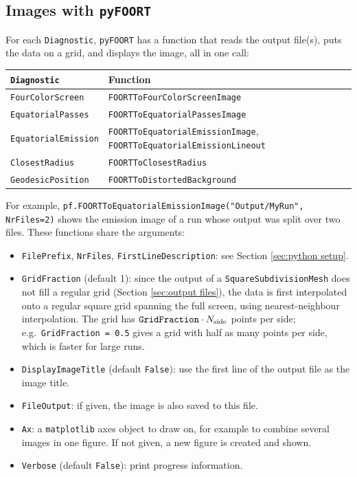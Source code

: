 \documentclass[11pt,a4paper]{article}
\newcommand{\code}[1]{{\tt #1}}
\begin{document}
\subsection{Images with \code{pyFOORT}}\label{sec:pyFOORT}
 
For each \code{Diagnostic}, \code{pyFOORT} has a function that reads the output file(s), puts the data on a grid, and displays the image, all in one call:
\begin{center}
\begin{tabular}{ll}
\code{Diagnostic} & Function \\ \hline
\code{FourColorScreen} & \code{FOORTToFourColorScreenImage} \\
\code{EquatorialPasses} & \code{FOORTToEquatorialPassesImage} \\
\code{EquatorialEmission} & \code{FOORTToEquatorialEmissionImage}, \code{FOORTToEquatorialEmissionLineout} \\
\code{ClosestRadius} & \code{FOORTToClosestRadius} \\
\code{GeodesicPosition} & \code{FOORTToDistortedBackground}
\end{tabular}
\end{center}
For example, \code{pf.FOORTToEquatorialEmissionImage("Output/MyRun", NrFiles=2)} shows the emission image of a run whose output was split over two files. These functions share the arguments:
\begin{itemize}
 \item \code{FilePrefix}, \code{NrFiles}, \code{FirstLineDescription}: see Section \ref{sec:python setup}.
 \item \code{GridFraction} (default 1): since the output of a \code{SquareSubdivisionMesh} does not fill a regular grid (Section \ref{sec:output files}), the data is first interpolated onto a regular square grid spanning the full screen, using nearest-neighbour interpolation. The grid has $\code{GridFraction}\cdot N_\text{side}$ points per side; e.g.\ \code{GridFraction = 0.5} gives a grid with half as many points per side, which is faster for large runs.
 \item \code{DisplayImageTitle} (default \code{False}): use the first line of the output file as the image title.
 \item \code{FileOutput}: if given, the image is also saved to this file.
 \item \code{Ax}: a \code{matplotlib} axes object to draw on, for example to combine several images in one figure. If not given, a new figure is created and shown.
 \item \code{Verbose} (default \code{False}): print progress information.
\end{itemize}
\end{document}
